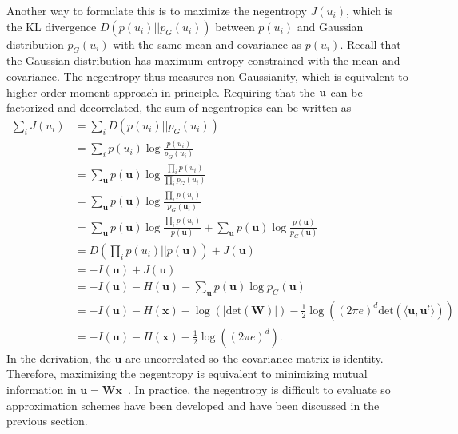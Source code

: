 \documentclass[aps,prl,preprint,superscriptaddress]{revtex4-2}
\begin{document}
Another way to formulate this is to maximize the negentropy $J(u_{i})$, which is the KL divergence $D(p(u_{i})||p_{G}(u_{i}))$ between $p(u_{i})$ and Gaussian distribution $p_{G}(u_{i})$ with the same mean and covariance as $p(u_{i})$. Recall that the Gaussian distribution has maximum entropy constrained with the mean and covariance. The negentropy thus measures non-Gaussianity, which is equivalent to higher order moment approach in principle. Requiring that the $\bf{u}$ can be factorized and decorrelated, the sum of negentropies can be written as
\begin{align}
\sum_{i}J(u_{i}) &= \sum_{i}D(p(u_{i})||p_{G}(u_{i})) \\
&= \sum_{i}p(u_{i})\log\frac{p(u_{i})}{p_{G}(u_{i})} \\
&= \sum_{\mathbf{u}}p(\mathbf{u}) \log\frac{\prod_{i}p(u_{i})}{\prod_{i}p_{G}(u_{i})} \\
&= \sum_{\mathbf{u}}p(\mathbf{u}) \log\frac{\prod_{i}p(u_{i})}{p_{G}(\mathbf{u}_{i})} \\
&= \sum_{\mathbf{u}}p(\mathbf{u}) \log\frac{\prod_{i}p(u_{i})}{p(\mathbf{u})} + \sum_{\mathbf{u}}p(\mathbf{u})\log\frac{p(\mathbf{u})}{p_{G}(\mathbf{u})} \\
&= D \left (\prod_{i}p(u_{i})||p(\mathbf{u}) \right) + J(\mathbf{u}) \\
&= -I(\mathbf{u}) + J(\mathbf{u}) \\
& = -I(\mathbf{u}) - H(\mathbf{u}) - \sum_{\mathbf{u}}p(\mathbf{u})\log p_{G}(\mathbf{u}) \\
& = -I(\mathbf{u}) - H(\mathbf{x}) - \log(|\mathrm{det}(\mathbf{W})|) - \frac{1}{2}\log((2\pi e)^{d} \mathrm{det}(\langle \mathbf{u}, \mathbf{u}^{t} \rangle))\\
&= -I(\mathbf{u}) - H(\mathbf{x}) - \frac{1}{2}\log((2\pi e)^{d}).
\end{align}
In the derivation, the $\mathbf{u}$ are uncorrelated so the covariance matrix is identity. Therefore, maximizing the negentropy is equivalent to minimizing mutual information in $\mathbf{u} = \mathbf{W}\mathbf{x}$~\cite{lee1998independent}.
In practice, the negentropy is difficult to evaluate so approximation schemes have been developed and have been discussed in the previous section.
\end{document}
